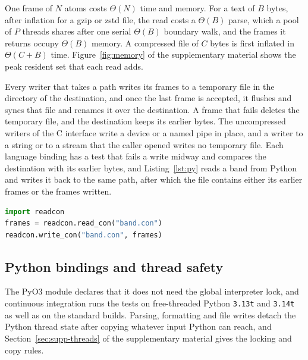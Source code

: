 \documentclass[preprint,12pt]{elsarticle}
\begin{document}
One frame of \(N\) atoms costs \(\Theta(N)\) time and memory.
For a text of \(B\) bytes, after inflation for a gzip or zstd file, the read costs a \(\Theta(B)\) parse, which a pool of \(P\) threads shares after one serial \(\Theta(B)\) boundary walk, and the frames it returns occupy \(\Theta(B)\) memory.
A compressed file of \(C\) bytes is first inflated in \(\Theta(C+B)\) time.
Figure~\ref*{fig:memory} of the supplementary material shows the peak resident set that each read adds.

Every writer that takes a path writes its frames to a temporary file in the directory of the destination, and once the last frame is accepted, it flushes and syncs that file and renames it over the destination.
A frame that fails deletes the temporary file, and the destination keeps its earlier bytes.
The uncompressed writers of the C interface write a device or a named pipe in place, and a writer to a string or to a stream that the caller opened writes no temporary file.
Each language binding has a test that fails a write midway and compares the destination with its earlier bytes, and Listing~\ref{lst:py} reads a band from Python and writes it back to the same path, after which the file contains either its earlier frames or the frames written.

\begin{lstlisting}[language=Python,caption={\textbf{A checkpoint round trip in Python.} The default printer keeps every binary64 value; six decimals are a separate argument.},label={lst:py}]
import readcon
frames = readcon.read_con("band.con")
readcon.write_con("band.con", frames)
\end{lstlisting}

\subsection{Python bindings and thread safety}\label{sec:python-threads}
The PyO3 module declares that it does not need the global interpreter lock, and continuous integration runs the tests on free-threaded Python \texttt{3.13t} and \texttt{3.14t} as well as on the standard builds.
Parsing, formatting and file writes detach the Python thread state after copying whatever input Python can reach, and Section~\ref*{sec:supp-threads} of the supplementary material gives the locking and copy rules.
\end{document}
